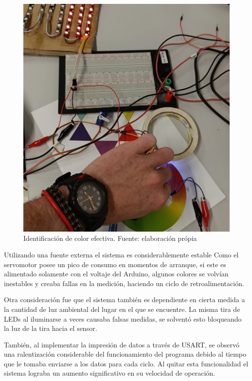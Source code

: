 
\begin{figure}[H]
    \centering
    \includegraphics[width=0.9\columnwidth]{anexos/colores/EvidenciaFuncionamiento.jpg}
    \caption{Identificación de color efectiva. Fuente: elaboración própia}
    \label{fig:color_evidencia}
\end{figure}



Utilizando una fuente externa el sistema es considerablemente estable
Como el servomotor posee un pico de consumo en momentos de arranque, si este es alimentado solamente con el voltaje del Arduino, algunos colores se volvían inestables y creaba fallas en la medición, haciendo un ciclo de retroalimentación.

Otra consideración fue que el sistema también es dependiente en cierta medida a la cantidad de luz ambiental del lugar en el que se encuentre. La misma tira de LEDs al iluminarse a veces causaba falsas medidas, se solventó esto bloqueando la luz de la tira hacia el sensor.

También, al implementar la impresión de datos a través de USART, se observó una ralentización considerable del funcionamiento del programa debido al tiempo que le tomaba enviarse a los datos para cada ciclo. Al quitar esta funcionalidad el sistema lograba un aumento significativo en su velocidad de operación.

